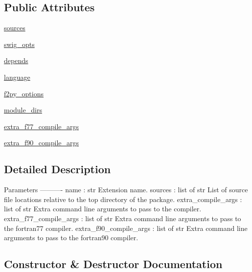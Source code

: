 \subsection*{Public Attributes}
\begin{DoxyCompactItemize}
\item 
\hyperlink{classnumpy_1_1distutils_1_1extension_1_1Extension_a5c763dbd644ad01edebefd5b5bdbf63a}{sources}
\item 
\hyperlink{classnumpy_1_1distutils_1_1extension_1_1Extension_aaf94c3c45f5acdbe821e3b0f6ee87136}{swig\+\_\+opts}
\item 
\hyperlink{classnumpy_1_1distutils_1_1extension_1_1Extension_a7e1ad17d1819aaf93b3ae4056d9b0a24}{depends}
\item 
\hyperlink{classnumpy_1_1distutils_1_1extension_1_1Extension_af7c51af2bbc2d8ed2a6ed8244aa6ea8d}{language}
\item 
\hyperlink{classnumpy_1_1distutils_1_1extension_1_1Extension_af8332487960ce13f8f1ab2d96ff4e4e9}{f2py\+\_\+options}
\item 
\hyperlink{classnumpy_1_1distutils_1_1extension_1_1Extension_a6fa1250ef3ef1abfe4f0afd52e7ba8ee}{module\+\_\+dirs}
\item 
\hyperlink{classnumpy_1_1distutils_1_1extension_1_1Extension_a67d939e16e48b3365d5ef90b87449444}{extra\+\_\+f77\+\_\+compile\+\_\+args}
\item 
\hyperlink{classnumpy_1_1distutils_1_1extension_1_1Extension_a8b37eb5cdffa8234063f92181d7b948a}{extra\+\_\+f90\+\_\+compile\+\_\+args}
\end{DoxyCompactItemize}


\subsection{Detailed Description}
\begin{DoxyVerb}Parameters
----------
name : str
    Extension name.
sources : list of str
    List of source file locations relative to the top directory of
    the package.
extra_compile_args : list of str
    Extra command line arguments to pass to the compiler.
extra_f77_compile_args : list of str
    Extra command line arguments to pass to the fortran77 compiler.
extra_f90_compile_args : list of str
    Extra command line arguments to pass to the fortran90 compiler.
\end{DoxyVerb}
 

\subsection{Constructor \& Destructor Documentation}
\mbox{\label{classnumpy_1_1distutils_1_1extension_1_1Extension_af89b084c55694febda8caf7bf2e8f551}} 
